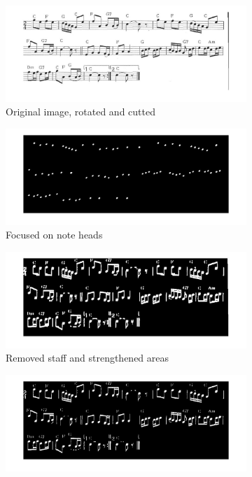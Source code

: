 \begin{figure}[htbp]
	\centering
    
  \begin{subfigure}[b]{0.7\textwidth}
        \includegraphics[width=\textwidth]{iv_orig.jpg}
        \caption{Original image, rotated and cutted}
  \end{subfigure}
  \begin{subfigure}[b]{0.7\textwidth}
        \includegraphics[width=\textwidth]{iv_noteHeads.jpg}
        \caption{Focused on note heads}
  \end{subfigure}
    \begin{subfigure}[b]{0.7\textwidth}
        \includegraphics[width=\textwidth]{iv_boxes.jpg}
        \caption{Removed staff and strengthened areas}
  \end{subfigure}
    \begin{subfigure}[b]{0.7\textwidth}
        \includegraphics[width=\textwidth]{iv_remStaff.jpg}

\end{subfigure}
\end{figure}
